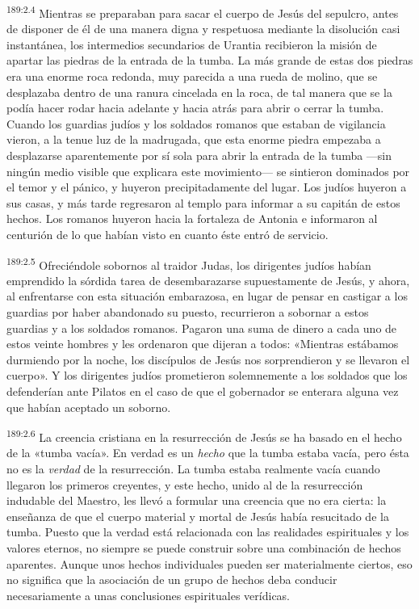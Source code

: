 \par 
\textsuperscript{189:2.4} Mientras se preparaban para sacar el cuerpo de Jesús del sepulcro, antes de disponer de él de una manera digna y respetuosa mediante la disolución casi instantánea, los intermedios secundarios de Urantia recibieron la misión de apartar las piedras de la entrada de la tumba. La más grande de estas dos piedras era una enorme roca redonda, muy parecida a una rueda de molino, que se desplazaba dentro de una ranura cincelada en la roca, de tal manera que se la podía hacer rodar hacia adelante y hacia atrás para abrir o cerrar la tumba. Cuando los guardias judíos y los soldados romanos que estaban de vigilancia vieron, a la tenue luz de la madrugada, que esta enorme piedra empezaba a desplazarse aparentemente por sí sola para abrir la entrada de la tumba ---sin ningún medio visible que explicara este movimiento--- se sintieron dominados por el temor y el pánico, y huyeron precipitadamente del lugar. Los judíos huyeron a sus casas, y más tarde regresaron al templo para informar a su capitán de estos hechos. Los romanos huyeron hacia la fortaleza de Antonia e informaron al centurión de lo que habían visto en cuanto éste entró de servicio.

\par 
\textsuperscript{189:2.5} Ofreciéndole sobornos al traidor Judas, los dirigentes judíos habían emprendido la sórdida tarea de desembarazarse supuestamente de Jesús, y ahora, al enfrentarse con esta situación embarazosa, en lugar de pensar en castigar a los guardias por haber abandonado su puesto, recurrieron a sobornar a estos guardias y a los soldados romanos. Pagaron una suma de dinero a cada uno de estos veinte hombres y les ordenaron que dijeran a todos: «Mientras estábamos durmiendo por la noche, los discípulos de Jesús nos sorprendieron y se llevaron el cuerpo». Y los dirigentes judíos prometieron solemnemente a los soldados que los defenderían ante Pilatos en el caso de que el gobernador se enterara alguna vez que habían aceptado un soborno.

\par 
\textsuperscript{189:2.6} La creencia cristiana en la resurrección de Jesús se ha basado en el hecho de la «tumba vacía». En verdad es un \textit{hecho} que la tumba estaba vacía, pero ésta no es la \textit{verdad} de la resurrección. La tumba estaba realmente vacía cuando llegaron los primeros creyentes, y este hecho, unido al de la resurrección indudable del Maestro, les llevó a formular una creencia que no era cierta: la enseñanza de que el cuerpo material y mortal de Jesús había resucitado de la tumba. Puesto que la verdad está relacionada con las realidades espirituales y los valores eternos, no siempre se puede construir sobre una combinación de hechos aparentes. Aunque unos hechos individuales pueden ser materialmente ciertos, eso no significa que la asociación de un grupo de hechos deba conducir necesariamente a unas conclusiones espirituales verídicas.

